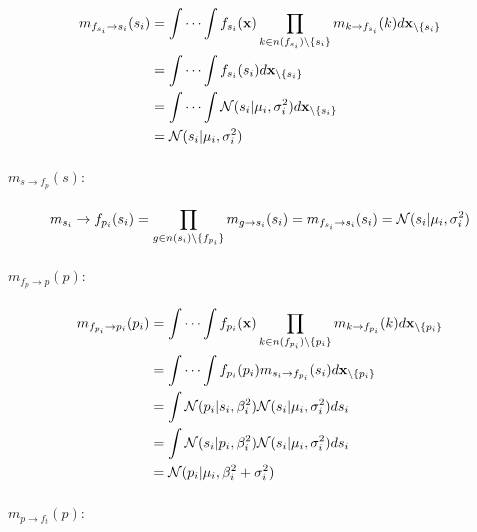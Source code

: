 \documentclass[11pt,twoside,spanish]{report} %
\begin{document}
\begin{equation}
	\centering
	\begin{split}
		m_{f_{s_i}\rightarrow s_i}(s_i) & = \int\cdots\int f_{s_i}(\textbf{x})\prod_{k\in n(f_{s_i})\backslash\{s_i\}} m_{k\rightarrow f_{s_i}}(k)d\textbf{x}_{\backslash \{s_i\}} \\
		& = \int\cdots\int f_{s_i}(s_i)d\textbf{x}_{\backslash \{s_i\}} \\
		& = \int\cdots\int \mathcal{N}(s_i \vert \mu_i,\sigma_i^2)d\textbf{x}_{\backslash \{s_i\}} \\
		& =  \mathcal{N}(s_i \vert \mu_i,\sigma_i^2)
	\end{split}
\end{equation}

\paragraph{$m_{s\rightarrow f_{p}}(s):$}

\begin{equation}
	\centering
	m_{s_i}\rightarrow f_{p_i}(s_i) = \prod_{g\in n(s_i)\backslash\{f_{p_i}\}} m_{g\rightarrow s_i}(s_i)
	= m_{f_{s_i}\rightarrow s_i}(s_i)
	=  \mathcal{N}(s_i \vert \mu_i,\sigma_i^2)
\end{equation}

\paragraph{$m_{f_{p}\rightarrow p}(p):$}

\begin{equation}
	\centering
	\begin{split}
		m_{f_{p_i}\rightarrow p_i}(p_i) & = \int\cdots\int f_{p_i}(\textbf{x})\prod_{k\in n(f_{p_i})\backslash\{p_i\}} m_{k\rightarrow f_{p_i}}(k)d\textbf{x}_{\backslash \{p_i\}} \\
		& = \int\cdots\int f_{p_i}(p_i) m_{s_i\rightarrow f_{p_i}}(s_i)d\textbf{x}_{\backslash \{p_i\}} \\
		& = \int \mathcal{N}(p_i \vert s_i,\beta_i^2) \mathcal{N}(s_i \vert \mu_i,\sigma_i^2)ds_i \\
		& = \int \mathcal{N}(s_i \vert p_i,\beta_i^2) \mathcal{N}(s_i \vert \mu_i,\sigma_i^2)ds_i \\
		& =  \mathcal{N}(p_i \vert \mu_i,\beta_i^2+\sigma_i^2)
	\end{split}
\end{equation}

\paragraph{$m_{p\rightarrow f_{t}}(p):$}
\end{document}
